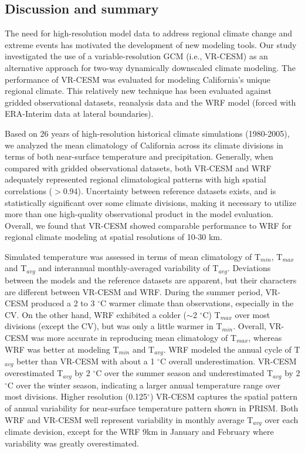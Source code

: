 \documentclass[ms]{agutex}   %
\begin{document}
\begin{article}
\section{Discussion and summary} \label{sec:Discussion}

The need for high-resolution model data to address regional climate change and extreme events has motivated the development of new modeling tools.  Our study investigated the use of a variable-resolution GCM (i.e., VR-CESM) as an alternative approach for two-way dynamically downscaled climate modeling. The performance of VR-CESM was evaluated for modeling California's unique regional climate. This relatively new technique has been evaluated against gridded observational datasets, reanalysis data and the WRF model (forced with ERA-Interim data at lateral boundaries).

Based on 26 years of high-resolution historical climate simulations (1980-2005), we analyzed the mean climatology of California across its climate divisions in terms of both near-surface temperature and precipitation. Generally, when compared with gridded observational datasets, both VR-CESM and WRF adequately represented regional climatological patterns with high spatial correlations ($>$0.94). Uncertainty between reference datasets exists, and is statistically significant over some climate divisions, making it necessary to utilize more than one high-quality observational product in the model evaluation. Overall, we found that VR-CESM showed comparable performance to WRF for regional climate modeling at spatial resolutions of 10-30 km.


Simulated temperature was assessed in terms of mean climatology of T$_{min}$, T$_{max}$ and T$_{avg}$ and interannual monthly-averaged variability of T$_{avg}$.  Deviations between the models and the reference datasets are apparent, but their characters are different between VR-CESM and WRF. During the summer period, VR-CESM produced a 2 to 3 $^\circ$C warmer climate than observations, especially in the CV. On the other hand, WRF exhibited a colder ($\sim$2 $^\circ$C) T$_{max}$ over most divisions (except the CV), but was only a little warmer in T$_{min}$. Overall, VR-CESM was more accurate in reproducing mean climatology of T$_{max}$, whereas WRF was better at modeling T$_{min}$ and T$_{avg}$. WRF modeled the annual cycle of T$_{avg}$ better than VR-CESM with about a 1 $^\circ$C overall underestimation. VR-CESM overestimated T$_{avg}$ by 2 $^\circ$C over the summer season and underestimated T$_{avg}$ by 2 $^\circ$C over the winter season, indicating a larger annual temperature range over most divisions. Higher resolution (0.125$^\circ$) VR-CESM captures the spatial pattern of annual variability for near-surface temperature pattern shown in PRISM. Both WRF and VR-CESM well represent variability in monthly average T$_{avg}$ over each climate devision, except for the WRF 9km in January and February where variability was greatly overestimated.



\end{article}
\end{document}
